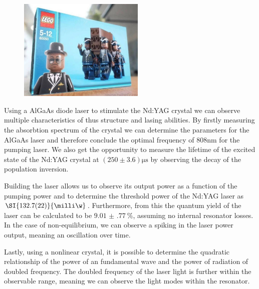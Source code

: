 \documentclass[../main.tex]{subfiles}
\begin{document}
\begin{figure}[H]
    \centering
    \includegraphics[width=6cm]{Bilddateien/CoffinDance.jpg}
    \label{fig:myfreshbild}
\end{figure}

Using a AlGaAs diode laser to stimulate the Nd:YAG crystal we can observe multiple characteristics of thus structure and lasing abilities. By firstly measuring the absorbtion spectrum of the crystal we can determine the parameters for the AlGaAs laser and therefore conclude the optimal frequency of $808\si{\nm}$ for the pumping laser. We also get the opportunity to measure the lifetime of the excited state of the Nd:YAG crystal at $(250\pm 3.6)\si{\micro\s}$ by observing the decay of the population inversion.

Building the laser allows us to observe its output power as a function of the pumping power and to determine the threshold power of the Nd:YAG laser as $\SI{132.7(22)}{\milli\w}$. Furthermore, from this the quantum yield of the laser can be calculated to be $\SI{9.01(77)}{\percent}$, assuming no internal resonator losses. In the case of non-equilibrium, we can observe a spiking in the laser power output, meaning an oscillation over time.

Lastly, using a nonlinear crystal, it is possible to determine the quadratic relationship of the power of an fundamental wave and the power of radiation of doubled frequency. The doubled frequency of the laser light is further within the observable range, meaning we can observe the light modes within the resonator.
\end{document}
